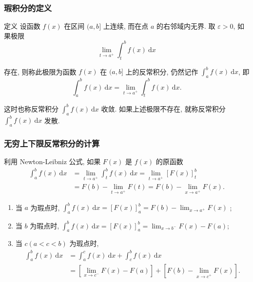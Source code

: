 \documentclass[
10pt,
aspectratio=43,
]{beamer}
\begin{document}
\begin{frame}
	\frametitle{瑕积分的定义}
	\everymath{\displaystyle}
	\begin{block}{定义}
		设函数 $f(x)$ 在区间 $(a, b]$ 上连续, 而在点 $a$ 的右邻域内无界. 取 $\varepsilon>0$, 如果极限
		$$
			\lim _{t \rightarrow a^{+}} \int_t^b f(x) \mathrm{~d}x
		$$

		存在, 则称此极限为函数 $f(x)$ 在 $(a, b]$ 上的反常积分, 仍然记作 $\int_a^b f(x) \mathrm{~d}x$, 即
		$$
			\int_a^b f(x) \mathrm{~d}x=\lim _{t \rightarrow a^{+}} \int_t^b f(x) \mathrm{~d}x .
		$$

		这时也称反常积分 $\int_a^b f(x) \mathrm{~d}x$ 收敛.
		如果上述极限不存在, 就称反常积分 $\int_a^b f(x) \mathrm{~d}x$ 发散.
	\end{block}
\end{frame}

\begin{frame}
	\frametitle{无穷上下限反常积分的计算}
	\everymath{\displaystyle}
	利用 Newton-Leibniz 公式, 如果 $F(x)$ 是 $f(x)$ 的原函数
	$$
		\begin{aligned}
			\int_a^b f(x) \mathrm{~d}x & =\lim _{t \rightarrow a^{+}} \int_t^b f(x) \mathrm{~d}x=\lim _{t \rightarrow a^{+}}[F(x)]_t^b \\
			                           & =F(b)-\lim _{t \rightarrow a^{+}} F(t)=F(b)-\lim _{x \rightarrow a^{+}} F(x) .
		\end{aligned}
	$$
	\begin{enumerate}
		\item 当 $a$ 为瑕点时, $\int_a^b f(x) \mathrm{~d}x=[F(x)]_a^b=F(b)-\lim _{x \rightarrow a^{+}} F(x)$ ;
		\item 当 $b$ 为瑕点时, $\int_a^b f(x) \mathrm{~d}x=[F(x)]_a^b=\lim _{x \rightarrow b^{-}} F(x)-F(a)$;
		\item
		      当 $c(a<c<b)$ 为瑕点时,
		      $$
			      \begin{aligned}
				      \int_a^b f(x) \mathrm{~d}x & =\int_a^c f(x) \mathrm{~d}x+\int_c^b f(x) \mathrm{~d}x                                                   \\
				                                 & =\left[\lim _{x \rightarrow c^{-}} F(x)-F(a)\right]+\left[F(b)-\lim _{x \rightarrow c^{+}} F(x)\right] .
			      \end{aligned}
		      $$
	\end{enumerate}
\end{frame}
\end{document}

